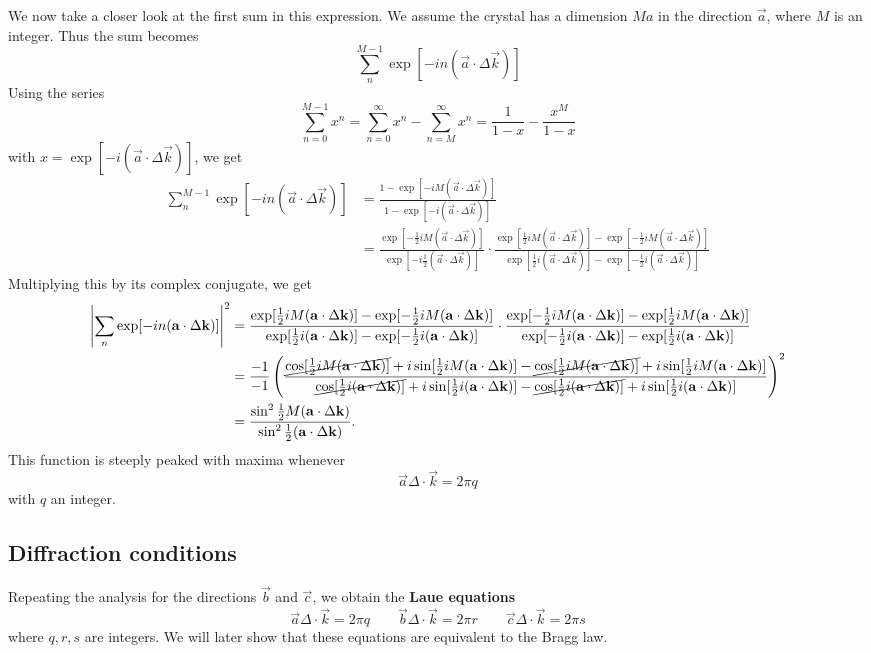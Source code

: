 We now take a closer look at the first sum in this expression. We assume the crystal has a dimension $M a$ in the direction $\vec{a}$, where $M$ is an integer. Thus the sum becomes
\[ \sum^{M-1}_{n}\exp[-in(\vec{a}\cdot \Delta\vec{k})] \]
Using the series
\[ \sum_{n=0}^{M-1}x^n = \sum_{n=0}^\infty x^n - \sum_{n=M}^\infty x^n = \frac{1}{1-x} - \frac{x^M}{1-x} \]
with $x = \exp[-i(\vec{a}\cdot \Delta\vec{k})]$, we get
\begin{align*}
\sum^{M-1}_{n}\exp[-in(\vec{a}\cdot \Delta\vec{k})] &= \frac{1- \exp[-iM(\vec{a}\cdot \Delta\vec{k})]}{1- \exp[-i(\vec{a}\cdot \Delta\vec{k})]} \\
&= \frac{\exp[- \frac{1}{2} iM(\vec{a}\cdot \Delta\vec{k})]}{\exp[-i \frac{1}{2}(\vec{a}\cdot \Delta\vec{k})]}\cdot \frac{\exp[\frac{1}{2}iM(\vec{a}\cdot \Delta\vec{k})] - \exp[- \frac{1}{2}iM(\vec{a}\cdot \Delta\vec{k})]}{\exp[\frac{1}{2}i(\vec{a}\cdot \Delta\vec{k})] - \exp[- \frac{1}{2}i(\vec{a}\cdot \Delta\vec{k})]}
\end{align*}
Multiplying this by its complex conjugate, we get
\begin{align*}
\left|\sum_{n}\exp[-in(\vec{a}\cdot \Delta\vec{k})]\right|^2 &= \frac{\exp[\frac{1}{2}iM(\vec{a}\cdot \Delta\vec{k})] - \exp[- \frac{1}{2}iM(\vec{a}\cdot \Delta\vec{k})]}{\exp[\frac{1}{2}i(\vec{a}\cdot \Delta\vec{k})] - \exp[- \frac{1}{2}i(\vec{a}\cdot \Delta\vec{k})]}\cdot\frac{\exp[-\frac{1}{2}iM(\vec{a}\cdot \Delta\vec{k})] - \exp[\frac{1}{2}iM(\vec{a}\cdot \Delta\vec{k})]}{\exp[-\frac{1}{2}i(\vec{a}\cdot \Delta\vec{k})] - \exp[\frac{1}{2}i(\vec{a}\cdot \Delta\vec{k})]} \\
&= \frac{-1}{-1}\left(\frac{\cancel{\cos[\frac{1}{2}iM(\vec{a}\cdot \Delta\vec{k})]} + i\sin[\frac{1}{2}iM(\vec{a}\cdot \Delta\vec{k})] - \cancel{\cos[\frac{1}{2}iM(\vec{a}\cdot \Delta\vec{k})]} + i\sin[\frac{1}{2}iM(\vec{a}\cdot \Delta\vec{k})]}{\cancel{\cos[\frac{1}{2}i(\vec{a}\cdot \Delta\vec{k})]} + i\sin[\frac{1}{2}i(\vec{a}\cdot \Delta\vec{k})] - \cancel{\cos[\frac{1}{2}i(\vec{a}\cdot \Delta\vec{k})]} + i\sin[\frac{1}{2}i(\vec{a}\cdot \Delta\vec{k})]}\right)^{2} \\
&= \frac{\sin^2 \frac{1}{2}M(\vec{a}\cdot \Delta \vec{k})}{\sin^2 \frac{1}{2}(\vec{a}\cdot \Delta \vec{k})}.
\end{align*}
This function is steeply peaked with maxima whenever
\[ \vec{a}\Delta \cdot \vec{k} = 2\pi q \]
with $q$ an integer.
\subsection{Diffraction conditions}
Repeating the analysis for the directions $\vec{b}$ and $\vec{c}$, we obtain the \textbf{Laue equations}
\[ \boxed{\vec{a}\Delta \cdot \vec{k} = 2\pi q \qquad
\vec{b}\Delta \cdot \vec{k} = 2\pi r \qquad
\vec{c}\Delta \cdot \vec{k} = 2\pi s} \]
where $q,r,s$ are integers. We will later show that these equations are equivalent to the Bragg law.
